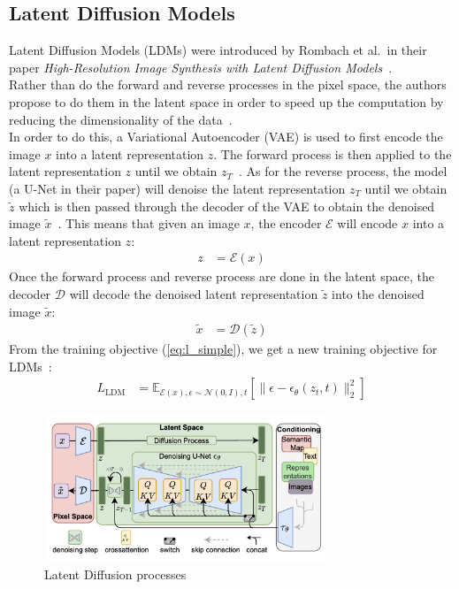 \documentclass[twoside]{article}
\numberwithin{equation}{section}
\numberwithin{figure}{section}
\begin{document}
\subsection{Latent Diffusion Models}
Latent Diffusion Models (LDMs) were introduced by Rombach et al.\ in their paper \textit{High-Resolution Image Synthesis with Latent Diffusion Models}~\cite{rombach2022highresolution}. \\
Rather than do the forward and reverse processes in the pixel space, the authors propose to do them in the latent space in order to speed up the computation by reducing the dimensionality of the data~\cite{rombach2022highresolution}. \\
In order to do this, a Variational Autoencoder (VAE) is used to first encode the image $x$ into a latent representation $z$. The forward process is then applied to the latent representation $z$ until we obtain $z_T$~\cite{rombach2022highresolution}.
As for the reverse process, the model (a U-Net in their paper) will denoise the latent representation $z_T$ until we obtain $\tilde{z}$ which is then passed through the decoder of the VAE to obtain the denoised image $\tilde{x}$~\cite{rombach2022highresolution}.
This means that given an image $x$, the encoder $\mathcal{E}$ will encode $x$ into a latent representation $z$:
\begin{align}
  z &= \mathcal{E}(x)
\end{align}
Once the forward process and reverse process are done in the latent space, the decoder $\mathcal{D}$ will decode the denoised latent representation $\tilde{z}$ into the denoised image $\tilde{x}$:
\begin{align}
  \tilde{x} &= \mathcal{D}(\tilde{z})
\end{align}
From the training objective (\ref{eq:l_simple}), we get a new training objective for LDMs~\cite{rombach2022highresolution}:
\begin{align}
  L_{\text{LDM}} &= \mathbb{E}_{\mathcal{E}(x), \epsilon \sim \mathcal{N}(0, I), t} \left[ \| \epsilon - \epsilon_\theta (z_t, t) \|_2^2 \right]
\end{align}
\begin{figure}[h]
  \begin{center}
    \includegraphics[width=0.75\textwidth]{images/latentdiffusion.png}
    \caption{Latent Diffusion processes~\cite{rombach2022highresolution}}
  \end{center}
\end{figure}
\end{document}
